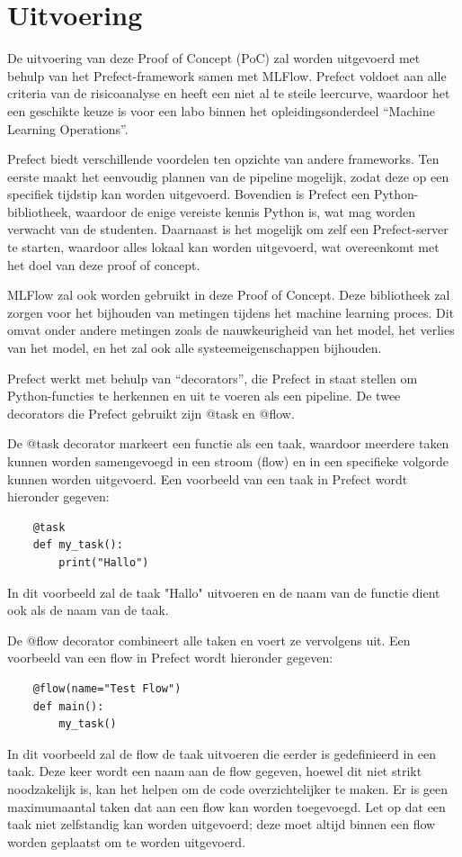 \section{Uitvoering}
De uitvoering van deze Proof of Concept (PoC) zal worden uitgevoerd met behulp van het Prefect-framework samen met MLFlow. Prefect voldoet aan alle criteria van de risicoanalyse en heeft een niet al te steile leercurve, waardoor het een geschikte keuze is voor een labo binnen het opleidingsonderdeel ``Machine Learning Operations''.

Prefect biedt verschillende voordelen ten opzichte van andere frameworks. Ten eerste maakt het eenvoudig plannen van de pipeline mogelijk, zodat deze op een specifiek tijdstip kan worden uitgevoerd. Bovendien is Prefect een Python-bibliotheek, waardoor de enige vereiste kennis Python is, wat mag worden verwacht van de studenten. Daarnaast is het mogelijk om zelf een Prefect-server te starten, waardoor alles lokaal kan worden uitgevoerd, wat overeenkomt met het doel van deze proof of concept.

MLFlow zal ook worden gebruikt in deze Proof of Concept. Deze bibliotheek zal zorgen voor het bijhouden van metingen tijdens het machine learning proces. Dit omvat onder andere metingen zoals de nauwkeurigheid van het model, het verlies van het model, en het zal ook alle systeemeigenschappen bijhouden.

Prefect werkt met behulp van ``decorators'', die Prefect in staat stellen om Python-functies te herkennen en uit te voeren als een pipeline. De twee decorators die Prefect gebruikt zijn @task en @flow.

De @task decorator markeert een functie als een taak, waardoor meerdere taken kunnen worden samengevoegd in een stroom (flow) en in een specifieke volgorde kunnen worden uitgevoerd. Een voorbeeld van een taak in Prefect wordt hieronder gegeven:
\begin{verbatim}
    @task
    def my_task():
        print("Hallo")
\end{verbatim}

In dit voorbeeld zal de taak "Hallo" uitvoeren en de naam van de functie dient ook als de naam van de taak.

De @flow decorator combineert alle taken en voert ze vervolgens uit. Een voorbeeld van een flow in Prefect wordt hieronder gegeven:
\begin{verbatim}
    @flow(name="Test Flow")
    def main():
        my_task()
\end{verbatim}
In dit voorbeeld zal de flow de taak uitvoeren die eerder is gedefinieerd in een taak. Deze keer wordt een naam aan de flow gegeven, hoewel dit niet strikt noodzakelijk is, kan het helpen om de code overzichtelijker te maken. Er is geen maximumaantal taken dat aan een flow kan worden toegevoegd. Let op dat een taak niet zelfstandig kan worden uitgevoerd; deze moet altijd binnen een flow worden geplaatst om te worden uitgevoerd.\\

